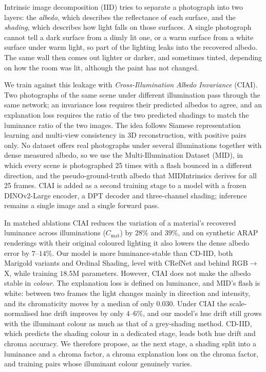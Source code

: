 Intrinsic image decomposition (IID) tries to separate a photograph into two layers:
the \emph{albedo}, which describes the reflectance of each surface, and the \emph{shading},
which describes how light falls on those surfaces.
A single photograph cannot tell a dark surface from a dimly lit one, or a warm surface
from a white surface under warm light, so part of the lighting leaks into the recovered
albedo. The same wall then comes out lighter or darker, and sometimes tinted, depending on
how the room was lit, although the paint has not changed.

We train against this leakage with \emph{Cross-Illumination Albedo Invariance} (CIAI).
Two photographs of the same scene under different illumination pass through the same
network; an invariance loss requires their predicted albedos to agree, and an explanation
loss requires the ratio of the two predicted shadings to match the luminance ratio of the
two images. The idea follows Siamese representation learning and multi-view consistency in
3D reconstruction, with positive pairs only. No dataset offers real photographs under
several illuminations together with dense measured albedo, so we use the Multi-Illumination
Dataset (MID), in which every scene is photographed 25 times with a flash bounced in a
different direction, and the pseudo-ground-truth albedo that MIDIntrinsics derives for all
25 frames. CIAI is added as a second training stage to a model with a frozen DINOv2-Large
encoder, a DPT decoder and three-channel shading; inference remains a single image and a
single forward pass.

In matched ablations CIAI reduces the variation of a material's recovered luminance across
illuminations ($C_{\text{mat}}$) by $28\%$ and $39\%$, and on synthetic ARAP renderings with
their original coloured lighting it also lowers the dense albedo error by $7$--$14\%$. Our
model is more luminance-stable than CD-IID, both Marigold variants and Ordinal Shading, level
with CRefNet and behind RGB$\rightarrow$X, while training $18.5$M parameters.
However, CIAI does not make the albedo stable in \emph{colour}. The explanation loss is
defined on luminance, and MID's flash is white: between two frames the light changes mainly
in direction and intensity, and its chromaticity moves by a median of only $0.030$. Under
CIAI the scale-normalised hue drift improves by only $4$--$6\%$, and our model's hue drift
still grows with the illuminant colour as much as that of a grey-shading method. CD-IID,
which predicts the shading colour in a dedicated stage, leads both hue drift and chroma
accuracy. We therefore propose, as the next stage, a shading split into a luminance and a
chroma factor, a chroma explanation loss on the chroma factor, and training pairs whose
illuminant colour genuinely varies.


